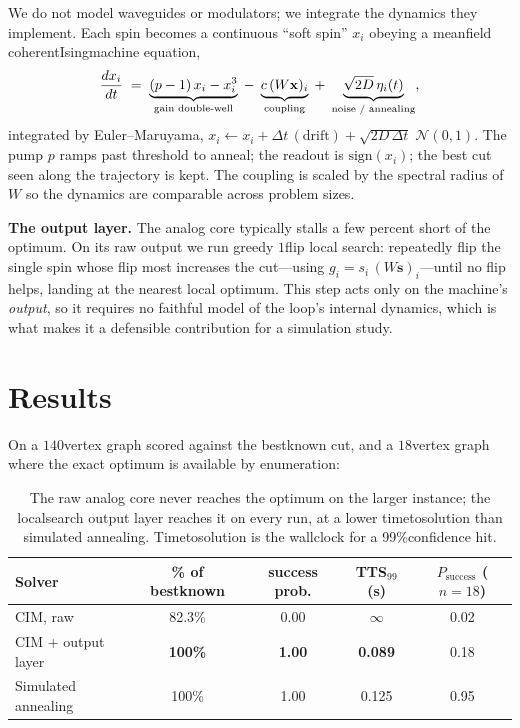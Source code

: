 \documentclass[11pt]{article}
\newcommand{\bs}{\mathbf{s}}
\newcommand{\bx}{\mathbf{x}}
\begin{document}
We do not model waveguides or modulators; we integrate the dynamics they implement. Each spin becomes a continuous ``soft spin'' $x_i$ obeying a mean\text{-}field coherent\text{-}Ising\text{-}machine equation,
\begin{equation}
\frac{dx_i}{dt} \;=\; \underbrace{(p-1)\,x_i - x_i^{3}}_{\text{gain double\text{-}well}} \;-\; \underbrace{c\,(W\bx)_i}_{\text{coupling}} \;+\; \underbrace{\sqrt{2D}\,\eta_i(t)}_{\text{noise / annealing}},
\end{equation}
integrated by Euler--Maruyama, $x_i \leftarrow x_i + \Delta t\,(\text{drift}) + \sqrt{2D\,\Delta t}\;\mathcal N(0,1)$. The pump $p$ ramps past threshold to anneal; the readout is $\mathrm{sign}(x_i)$; the best cut seen along the trajectory is kept. The coupling is scaled by the spectral radius of $W$ so the dynamics are comparable across problem sizes.

\textbf{The output layer.} The analog core typically stalls a few percent short of the optimum. On its raw output we run greedy $1$\text{-}flip local search: repeatedly flip the single spin whose flip most increases the cut---using $g_i = s_i\,(W\bs)_i$---until no flip helps, landing at the nearest local optimum. This step acts only on the machine's \emph{output}, so it requires no faithful model of the loop's internal dynamics, which is what makes it a defensible contribution for a simulation study.

\section{Results}

On a $140$\text{-}vertex graph scored against the best\text{-}known cut, and a $18$\text{-}vertex graph where the exact optimum is available by enumeration:

\begin{table}[h]
\centering
\small
\begin{tabular}{@{}lcccc@{}}
\toprule
\textbf{Solver} & \textbf{\% of best\text{-}known} & \textbf{success prob.} & \textbf{TTS$_{99}$ (s)} & \textbf{$P_{\text{success}}$ ($n{=}18$)}\\
\midrule
CIM, raw            & 82.3\% & 0.00 & $\infty$ & 0.02\\
CIM + output layer  & \textbf{100\%} & \textbf{1.00} & \textbf{0.089} & 0.18\\
Simulated annealing & 100\% & 1.00 & 0.125 & 0.95\\
\bottomrule
\end{tabular}
\caption{The raw analog core never reaches the optimum on the larger instance; the local\text{-}search output layer reaches it on every run, at a lower time\text{-}to\text{-}solution than simulated annealing. Time\text{-}to\text{-}solution is the wall\text{-}clock for a 99\%\text{-}confidence hit.}
\end{table}
\end{document}
